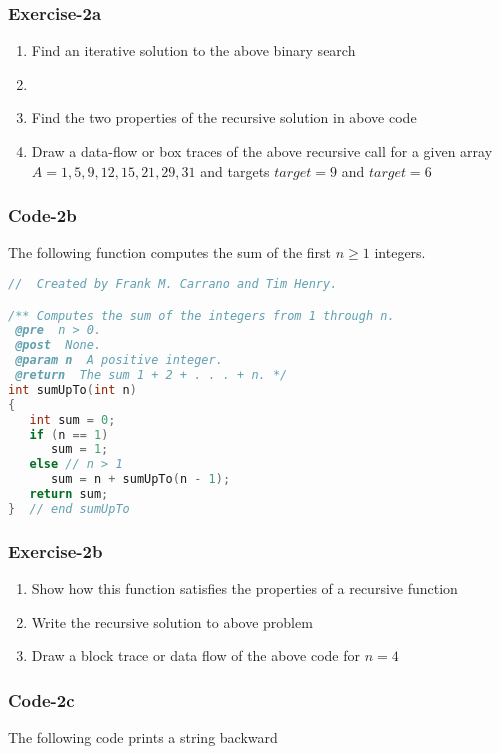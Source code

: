 \documentclass{article}
\begin{document}
\subsubsection{Exercise-2a}
\begin{enumerate}
\item Find an iterative solution to the above binary search
\item 
\item Find the two properties of the recursive solution in above code
\item Draw a data-flow or box traces of the above recursive call for a given array  $A = {1,5,9,12,15,21,29,31}$ and targets $target=9$ and $target=6$
\end{enumerate}

\subsubsection*{Code-2b}
The following function computes the sum of the first $n\geq1$ integers.

\begin{lstlisting}[language=C++]
//  Created by Frank M. Carrano and Tim Henry.

/** Computes the sum of the integers from 1 through n.
 @pre  n > 0.
 @post  None.
 @param n  A positive integer.
 @return  The sum 1 + 2 + . . . + n. */
int sumUpTo(int n)
{
   int sum = 0;
   if (n == 1)
      sum = 1;
   else // n > 1
      sum = n + sumUpTo(n - 1);
   return sum;
}  // end sumUpTo

\end{lstlisting}

\subsubsection*{Exercise-2b}
\begin{enumerate}
\item Show how this function satisfies the properties of a recursive function
\item Write the recursive solution to above problem
\item Draw a block trace or data flow of the above code for $n=4$
\end{enumerate}

\subsubsection{Code-2c}
The following code prints a string backward
\end{document}
